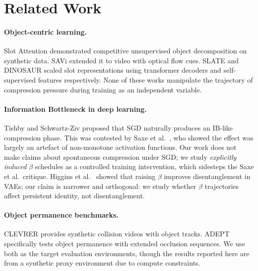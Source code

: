 \documentclass{article}
\begin{document}
\section{Related Work}

\paragraph{Object-centric learning.}
Slot Attention \cite{locatello2020object} demonstrated competitive unsupervised
object decomposition on synthetic data.
SAVi \cite{kipf2021conditional} extended it to video with optical flow cues.
SLATE \cite{singh2022simple} and DINOSAUR \cite{seitzer2023bridging} scaled
slot representations using transformer decoders and self-supervised features
respectively.
None of these works manipulate the trajectory of compression pressure during
training as an independent variable.

\paragraph{Information Bottleneck in deep learning.}
Tishby and Schwartz-Ziv \cite{tishby2017opening} proposed that SGD naturally
produces an IB-like compression phase.
This was contested by Saxe et al.\ \cite{saxe2019information}, who showed the
effect was largely an artefact of non-monotone activation functions.
Our work does not make claims about spontaneous compression under SGD; we study
\emph{explicitly induced} $\beta$ schedules as a controlled training intervention,
which sidesteps the Saxe et al.\ critique.
Higgins et al.\ \cite{higgins2017beta} showed that raising $\beta$ improves
disentanglement in VAEs; our claim is narrower and orthogonal: we study whether
$\beta$ trajectories affect persistent identity, not disentanglement.

\paragraph{Object permanence benchmarks.}
CLEVRER \cite{chen2020clevrer} provides synthetic collision videos with object
tracks.
ADEPT \cite{kortmann2022adept} specifically tests object permanence with
extended occlusion sequences.
We use both as the target evaluation environments, though the results reported
here are from a synthetic proxy environment due to compute constraints.


\end{document}
